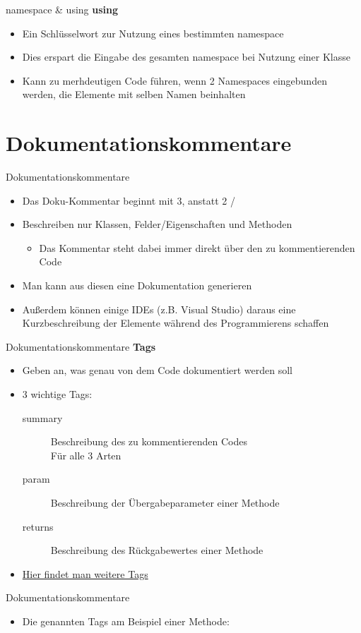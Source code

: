\begin{frame}{namespace \& using}
	\textbf{using}\\
	\begin{itemize}
		\item Ein Schlüsselwort zur Nutzung eines bestimmten \alert{namespace}
		\item Dies erspart die Eingabe des gesamten namespace bei Nutzung einer Klasse
		\item Kann zu merhdeutigen Code führen, wenn 2 Namespaces eingebunden werden, die Elemente mit selben Namen beinhalten
	\end{itemize}
	
\end{frame}

\section{Dokumentationskommentare}
\begin{frame}{Dokumentationskommentare}
	\begin{itemize}
		\item Das Doku-Kommentar beginnt mit 3, anstatt 2 \alert{/}
		\item Beschreiben nur Klassen, Felder/Eigenschaften und Methoden
		\begin{itemize}
			\item Das Kommentar steht dabei immer direkt über den zu kommentierenden Code
		\end{itemize}
		\item Man kann aus diesen eine Dokumentation generieren
		\item Außerdem können einige IDEs (z.B. Visual Studio) daraus eine Kurzbeschreibung der Elemente während des Programmierens schaffen		
	\end{itemize}
\end{frame}

\begin{frame}{Dokumentationskommentare}
	\textbf{Tags}
	\begin{itemize}
		\item Geben an, was genau von dem Code dokumentiert werden soll
		\item 3 wichtige Tags:
		\begin{description}
			\item[summary] Beschreibung des zu kommentierenden Codes\\ Für alle 3 Arten
			\item[param] Beschreibung der Übergabeparameter einer Methode
			\item[returns] Beschreibung des Rückgabewertes einer Methode
		\end{description}
		\item \href{https://msdn.microsoft.com/de-de/library/5ast78ax.aspx}{Hier findet man weitere Tags}
	\end{itemize}
\end{frame}

\begin{frame}{Dokumentationskommentare}
	\begin{itemize}
		\item Die genannten Tags am Beispiel einer Methode:
	\end{itemize}
		
\end{frame}


